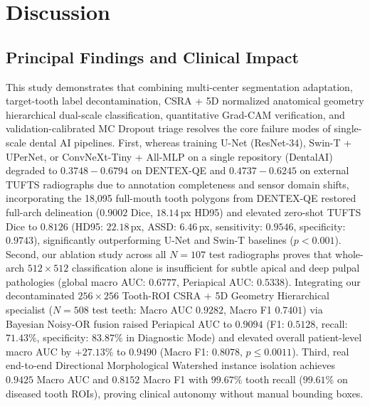 \documentclass[review]{elsarticle}
\begin{document}
\section{Discussion}
\label{sec:discussion}

\subsection{Principal Findings and Clinical Impact}
This study demonstrates that combining multi-center segmentation adaptation, target-tooth label decontamination, CSRA + 5D normalized anatomical geometry hierarchical dual-scale classification, quantitative Grad-CAM verification, and validation-calibrated MC Dropout triage resolves the core failure modes of single-scale dental AI pipelines. First, whereas training U-Net (ResNet-34), Swin-T + UPerNet, or ConvNeXt-Tiny + All-MLP on a single repository (DentalAI) degraded to $0.3748 - 0.6794$ on DENTEX-QE and $0.4737 - 0.6245$ on external TUFTS radiographs due to annotation completeness and sensor domain shifts, incorporating the 18,095 full-mouth tooth polygons from DENTEX-QE restored full-arch delineation ($0.9002$ Dice, $18.14$\,px HD95) and elevated zero-shot TUFTS Dice to $0.8126$ (HD95: $22.18$\,px, ASSD: $6.46$\,px, sensitivity: $0.9546$, specificity: $0.9743$), significantly outperforming U-Net and Swin-T baselines ($p < 0.001$). Second, our ablation study across all $N=107$ test radiographs proves that whole-arch $512 \times 512$ classification alone is insufficient for subtle apical and deep pulpal pathologies (global macro AUC: $0.6777$, Periapical AUC: $0.5338$). Integrating our decontaminated $256 \times 256$ Tooth-ROI CSRA + 5D Geometry Hierarchical specialist ($N=508$ test teeth: Macro AUC $0.9282$, Macro F1 $0.7401$) via Bayesian Noisy-OR fusion raised Periapical AUC to $0.9094$ (F1: $0.5128$, recall: $71.43\%$, specificity: $83.87\%$ in Diagnostic Mode) and elevated overall patient-level macro AUC by $+27.13\%$ to $0.9490$ (Macro F1: $0.8078$, $p \le 0.0011$). Third, real end-to-end Directional Morphological Watershed instance isolation achieves $0.9425$ Macro AUC and $0.8152$ Macro F1 with $99.67\%$ tooth recall ($99.61\%$ on diseased tooth ROIs), proving clinical autonomy without manual bounding boxes.
\end{document}
